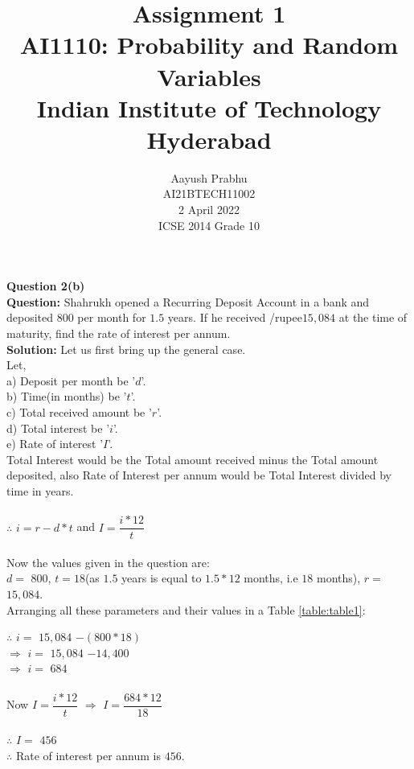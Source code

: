 \documentclass[journal,12pt,twocolumn]{IEEEtran}
\title{Assignment 1 \\ \Large AI1110: Probability and Random Variables \\ \large Indian Institute of Technology Hyderabad}
\author{Aayush Prabhu \\ \normalsize AI21BTECH11002 \\ \vspace*{20pt} \normalsize  2 April 2022 \\ \vspace*{20pt} \Large ICSE 2014 Grade 10}
\begin{document}
       \maketitle
       \textbf{Question 2(b)}\\
       \textbf{Question:} Shahrukh opened a Recurring Deposit Account in a bank and deposited \rupee$800$ per month for $1.5$ years. If he received /rupee$15,084$ at the time of maturity, find the rate of interest per annum.\\
       \textbf{Solution:} Let us first bring up the general case.\\
       Let,\\
       a) Deposit per month be '$d$'.\\
       b) Time(in months) be '$t$'.\\
       c) Total received amount be '$r$'.\\
       d) Total interest be '$i$'.\\
       e) Rate of interest '$I$'.\\
       Total Interest would be the Total amount received minus the Total amount deposited, also Rate of Interest per annum would be Total Interest divided by time in years.\\\\
       $\therefore$ $i=r-d*t$ and $I=\dfrac{i*12}{t}$\\\\
       Now the values given in the question are:\\
       $d=$ \rupee$800$, $t=18$(as $1.5$ years is equal to $1.5*12$ months, i.e $18$ months), $r=$ \rupee$15,084$.\\
       Arranging all these parameters and their values in a Table \eqref{table:table1}:
	\begin{table}[ht!]
		
		\caption{}
		\label{table:table1}	
	\end{table}
       $\therefore$ $i=$ \rupee$15,084$ $-$\rupee$(800*18)$\\
       $\Rightarrow$ $i=$ \rupee$15,084$ $-$\rupee$14,400$\\
       $\Rightarrow$ $i=$ \rupee$684$\\\\
       Now $I=\dfrac{i*12}{t}$
       $\Rightarrow$ $I=\dfrac{684*12}{18}$\\\\
       $\therefore$ $I=$ \rupee$456$\\
       $\therefore$ Rate of interest per annum is \rupee$456$.
\end{document}
